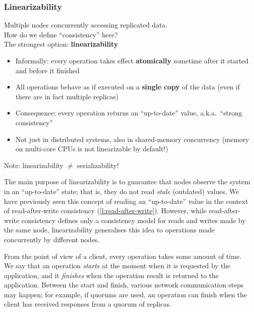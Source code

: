 \begin{frame}
    \label{s:linearizability}
    \frametitle{Linearizability}
    Multiple nodes concurrently accessing replicated data.\\
    How do we define ``consistency'' here?\\[1em]\pause
    The strongest option: \textbf{linearizability}\pause
    \begin{itemize}
        \item Informally: every operation takes effect \textbf{atomically} sometime after it started and before it finished\pause
        \item All operations behave as if executed on a \textbf{single copy} of the data (even if there are in fact multiple replicas)\pause
        \item Consequence: every operation returns an ``up-to-date'' value, a.k.a.\ ``strong consistency''\pause
        \item Not just in distributed systems, also in shared-memory concurrency (memory on multi-core CPUs is not linearizable by default!)\pause
    \end{itemize}
    Note: linearizability $\neq$ serializability!
\end{frame}
\label{l:linearizability}

The main purpose of linearizability is to guarantee that nodes observe the system in an ``up-to-date'' state; that is, they do not read \emph{stale} (outdated) values.
We have previously seen this concept of reading an ``up-to-date'' value in the context of read-after-write consistency (\autoref{l:read-after-write}).
However, while read-after-write consistency defines only a consistency model for reads and writes made by the same node, linearizability generalises this idea to operations made concurrently by different nodes.

From the point of view of a client, every operation takes some amount of time.
We say that an operation \emph{starts} at the moment when it is requested by the application, and it \emph{finishes} when the operation result is returned to the application.
Between the start and finish, various network communication steps may happen; for example, if quorums are used, an operation can finish when the client has received responses from a quorum of replicas.

